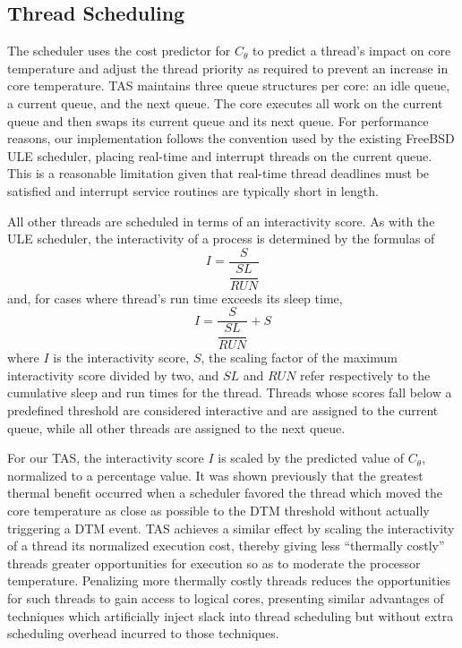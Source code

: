 \documentclass[times, 10pt,twocolumn]{IEEEtran}
\begin{document}
\subsection{Thread Scheduling}
\label{sec:selection} 
The scheduler uses the cost predictor for $C_{\theta}$ to predict a
thread's impact on core temperature and adjust the
thread priority as required to prevent an increase in core temperature.
TAS maintains three queue structures per core: an idle queue, a
current queue, and the next queue. The core executes all work on the
current queue and then swaps its current queue and its next queue. For
performance reasons, our implementation follows the convention used by
the existing FreeBSD ULE scheduler, placing real-time and interrupt
threads on the current queue.  This is a reasonable limitation given that
real-time thread deadlines must be satisfied and 
interrupt service routines are typically short in length.

All other threads are scheduled in terms of an interactivity score.  As
with the ULE scheduler, the interactivity of a process is
determined by the formulas of
\begin{equation}
  \label{eq:interactsleeprun} I = \dfrac{S}{\dfrac{SL}{RUN}}
\end{equation} 
and, for cases where thread's run time exceeds its sleep
time,
\begin{equation}
  \label{eq:interactrunsleep} I = \dfrac{S}{\dfrac{SL}{RUN}}+S
\end{equation} 
where $I$ is the interactivity score, $S$, the scaling factor of the
maximum interactivity score divided by two, and $SL$ and $RUN$ refer
respectively to the cumulative sleep and run times for the thread.   
Threads whose scores fall below a predefined threshold are considered
interactive and are assigned to the current queue, while all other
threads are assigned to the next queue.

For our TAS, the interactivity score $I$ is scaled by the predicted
value of $C_{\theta}$, normalized to a percentage value.  It was shown
previously \cite{Zhou2010b} that the greatest thermal
benefit occurred when a scheduler 
favored the thread which moved the core temperature as close as possible to
the DTM threshold without actually triggering a DTM event.  
TAS achieves a similar effect by scaling the interactivity of a thread
its normalized execution cost, thereby giving less ``thermally costly'' threads
greater opportunities for execution so as to moderate the
processor temperature.  Penalizing more thermally costly threads reduces
the opportunities for such threads to gain access to logical cores,
presenting similar advantages of techniques which
artificially inject slack into thread scheduling but
without extra scheduling overhead incurred to those techniques.
\end{document}
